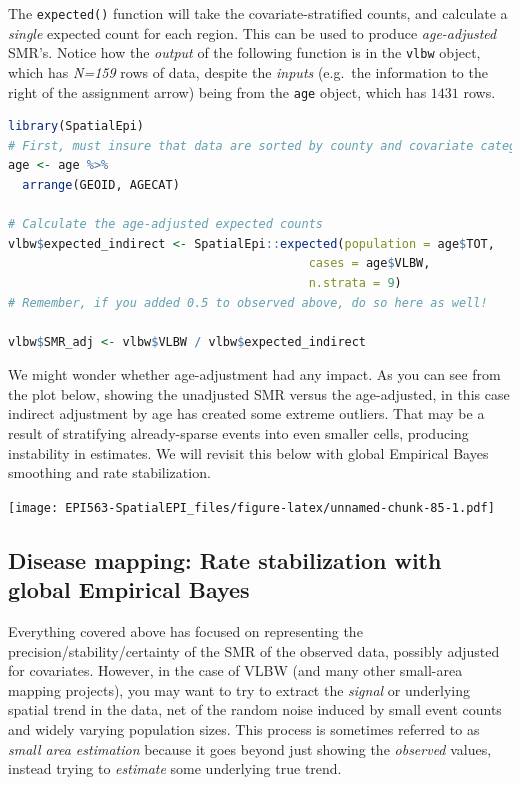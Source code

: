 \documentclass[
]{book}
\newcommand{\passthrough}[1]{#1}
\begin{document}
The \passthrough{\lstinline!expected()!} function will take the covariate-stratified counts, and calculate a \emph{single} expected count for each region. This can be used to produce \emph{age-adjusted} SMR's. Notice how the \emph{output} of the following function is in the \passthrough{\lstinline!vlbw!} object, which has \emph{N=159} rows of data, despite the \emph{inputs} (e.g.~the information to the right of the assignment arrow) being from the \passthrough{\lstinline!age!} object, which has \(1431\) rows.

\begin{lstlisting}[language=R]
library(SpatialEpi)
# First, must insure that data are sorted by county and covariate category
age <- age %>%
  arrange(GEOID, AGECAT)

# Calculate the age-adjusted expected counts
vlbw$expected_indirect <- SpatialEpi::expected(population = age$TOT, 
                                          cases = age$VLBW,
                                          n.strata = 9)
# Remember, if you added 0.5 to observed above, do so here as well!

vlbw$SMR_adj <- vlbw$VLBW / vlbw$expected_indirect
\end{lstlisting}

We might wonder whether age-adjustment had any impact. As you can see from the plot below, showing the unadjusted SMR versus the age-adjusted, in this case indirect adjustment by age has created some extreme outliers. That may be a result of stratifying already-sparse events into even smaller cells, producing instability in estimates. We will revisit this below with global Empirical Bayes smoothing and rate stabilization.

\texttt{[image: EPI563-SpatialEPI\_files/figure-latex/unnamed-chunk-85-1.pdf]}

\hypertarget{disease-mapping-rate-stabilization-with-global-empirical-bayes}{%
\subsection{Disease mapping: Rate stabilization with global Empirical Bayes}\label{disease-mapping-rate-stabilization-with-global-empirical-bayes}}

Everything covered above has focused on representing the precision/stability/certainty of the SMR of the observed data, possibly adjusted for covariates. However, in the case of VLBW (and many other small-area mapping projects), you may want to try to extract the \emph{signal} or underlying spatial trend in the data, net of the random noise induced by small event counts and widely varying population sizes. This process is sometimes referred to as \emph{small area estimation} because it goes beyond just showing the \emph{observed} values, instead trying to \emph{estimate} some underlying true trend.
\end{document}
